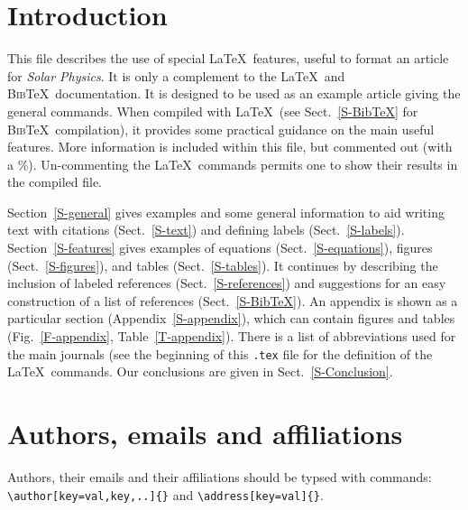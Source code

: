 \documentclass[namedreferences,hyperref,optionalrh]{spr-sola}
\newcommand{\BibTeX}{\textsc{Bib}\TeX}
\begin{document}
\section{Introduction}
     \label{S-Introduction} 

This file describes the use of special \LaTeX\ features,
useful to format an article for {\it Solar Physics}.  It is only a complement
to the \LaTeX\ and \BibTeX\ documentation.  
It is designed to be used as an example
article giving the general commands. When compiled with \LaTeX\ 
(see Sect.~\ref{S-BibTeX} for \BibTeX\ compilation), it provides
some practical guidance on the main useful features. More information
is included within this file, but commented out (with a \%).
Un-commenting the \LaTeX\ commands permits one to show their 
results in the compiled file.   
    
 Section~\ref{S-general} gives examples and some general information
to aid writing text with citations (Sect.~\ref{S-text})
and defining labels (Sect.~\ref{S-labels}).
Section~\ref{S-features} gives examples of equations 
(Sect.~\ref{S-equations}), figures (Sect.~\ref{S-figures}), and 
tables (Sect.~\ref{S-tables}).
It continues by describing the inclusion of labeled references
(Sect.~\ref{S-references}) and suggestions for an easy construction 
of a list of references (Sect.~\ref{S-BibTeX}). 
An appendix is shown as a particular section (Appendix~\ref{S-appendix}),
which can contain figures and tables (Fig.~\ref{F-appendix}, 
Table~\ref{T-appendix}).
There is a list of abbreviations used for the main journals (see the
beginning of this \texttt{.tex} file for the definition of the \LaTeX\ commands.
Our conclusions are given in Sect.~\ref{S-Conclusion}. 

\section{Authors, emails and affiliations}
\label{S-aug}
Authors, their emails and their affiliations should be typsed with commands: 
\verb+\author[key=val,key,..]{}+ and \verb+\address[key=val]{}+.
\end{document}
